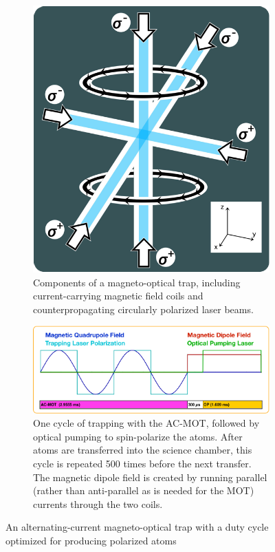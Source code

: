 

\begin{figure}[ht]
	\centering
	\begin{subfigure}[t]{0.242\textwidth}
		\centering
		\includegraphics[width=\textwidth]{mot.png}
		\caption{Components of a magneto-optical trap, including current-carrying magnetic field coils and counterpropagating circularly polarized laser beams.}
		\label{fig:mot}
	\end{subfigure}
	\hfill
	\begin{subfigure}[t]{0.728\textwidth}
		\centering
		\includegraphics[width=\textwidth]{acmot.png}
		\caption{One cycle of trapping with the AC-MOT, followed by optical pumping to spin-polarize the atoms.  After atoms are transferred into the science chamber, this cycle is repeated 500 times before the next transfer.  The magnetic dipole field is created by running parallel (rather than anti-parallel as is needed for the MOT) currents through the two coils.}
		\label{fig:acmot}
	\end{subfigure}
	\caption{An alternating-current magneto-optical trap with a duty cycle optimized for producing polarized atoms}	
	\label{fig:themot}
\end{figure}
